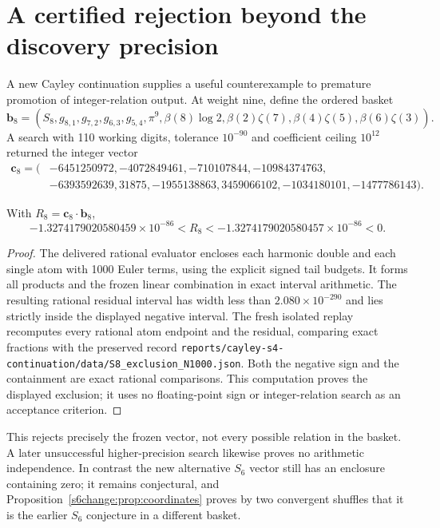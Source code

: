 \section{A certified rejection beyond the discovery precision}
\label{research:sec:S8-rejected}
A new Cayley continuation supplies a useful counterexample to premature
promotion of integer-relation output. At weight nine, define the ordered
basket
\[
 \mathbf b_8=(S_8,g_{8,1},g_{7,2},g_{6,3},g_{5,4},\pi^9,
 \beta(8)\log2,\beta(2)\zeta(7),\beta(4)\zeta(5),\beta(6)\zeta(3)).
\]
A search with 110 working digits, tolerance $10^{-90}$ and coefficient
ceiling $10^{12}$ returned the integer vector
\[
\begin{split}
 \mathbf c_8=(&-6451250972,-4072849461,-710107844,-10984374763,\\
 &-6393592639,31875,-1955138863,3459066102,-1034180101,-1477786143).
\end{split}
\]
\begin{proposition}
\label{research:prop:S8-rejected}
With $R_8=\mathbf c_8\cdot\mathbf b_8$,
\[
 -1.3274179020580459\times10^{-86}<R_8
 <-1.3274179020580457\times10^{-86}<0.
\]
\end{proposition}
\begin{proof}
The delivered rational evaluator encloses each harmonic double and each
single atom with 1000 Euler terms, using the explicit signed tail budgets.
It forms all products and the frozen linear combination in exact interval
arithmetic. The resulting rational residual interval has width less than
$2.080\times10^{-290}$ and lies strictly inside the displayed negative
interval. The fresh isolated replay recomputes every rational atom endpoint
and the residual, comparing exact fractions with the preserved record
\texttt{reports/cayley-s4-continuation/data/S8\_exclusion\_N1000.json}.
Both the negative sign and the containment are exact rational comparisons.
This computation proves the displayed exclusion; it uses no floating-point
sign or integer-relation search as an acceptance criterion.
\end{proof}
This rejects precisely the frozen vector, not every possible relation in
the basket. A later unsuccessful higher-precision search likewise proves
no arithmetic independence. In contrast the new alternative $S_6$ vector
still has an enclosure containing zero; it remains conjectural, and Proposition~\ref{s6change:prop:coordinates} proves by two convergent
shuffles that it is the earlier $S_6$ conjecture in a different basket.


